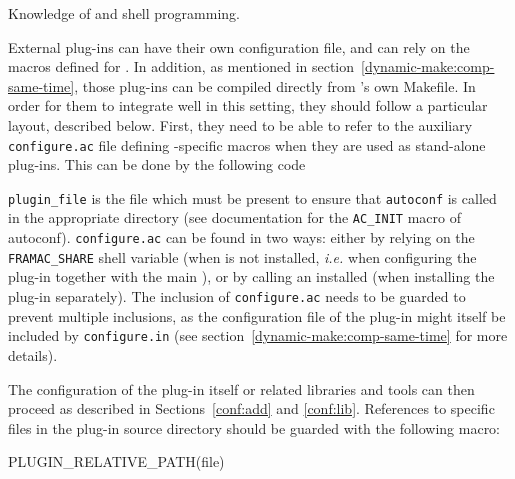 \begin{prereq}
  Knowledge of \autoconf and shell programming.
\end{prereq}

External plug-ins can have their own configuration file, and can rely on the
macros defined for \framac. In addition, as mentioned in
section~\ref{dynamic-make:comp-same-time}, those plug-ins can be
compiled directly from \framac's own Makefile. In order for them to
integrate well in this setting, they should follow a particular layout,
described below.
First, they need to be able to refer to the auxiliary \texttt{configure.ac}
file defining \framac-specific macros when they are used as stand-alone plug-ins.
This can be done by the following code

\texttt{plugin\_file} is the file which must be present to ensure that
\texttt{autoconf} is called in the appropriate directory (see documentation for
the \texttt{AC\_INIT} macro of autoconf). \texttt{configure.ac} can be found in
two ways: either by relying on the \texttt{FRAMAC\_SHARE} shell variable (when
\framac{} is not installed, {\it i.e.} when configuring the plug-in together
with the main \framac), or by calling an installed \framac (when installing
the plug-in separately). The inclusion of \texttt{configure.ac} needs to be
guarded to prevent multiple inclusions, as the configuration file of the plug-in
might itself be included by \texttt{configure.in}
(see section~\ref{dynamic-make:comp-same-time} for more details).

The configuration of the plug-in itself or related libraries and tools can then
proceed as described in Sections~\ref{conf:add} and \ref{conf:lib}. References
to specific files in the plug-in source directory should be guarded with the
following macro:
\begin{configurecode}
PLUGIN_RELATIVE_PATH(file)
\end{configurecode}

